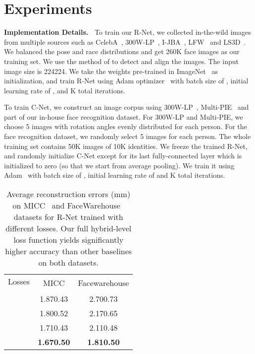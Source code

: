 \documentclass[10pt,twocolumn,letterpaper]{article}
\begin{document}
\section{Experiments}
\noindent\textbf{Implementation Details.~}
To train our R-Net, we collected in-the-wild images from multiple sources such as CelebA~\cite{liu2015deep}, 300W-LP~\cite{zhu2016face}, I-JBA~\cite{klare2015pushing}, LFW~\cite{huang2007labeled} and LS3D~\cite{bulat2017far}. We balanced the pose and race distributions and get 260K face images as our training set. We use the method of \cite{chen2016supervised} to detect and align the images. The input image size is 224224. We take the weights pre-trained in ImageNet~\cite{russakovsky2015imagenet} as initialization, and train R-Net using Adam optimizer~\cite{kingma2015adam} with batch size of , initial learning rate of , and K total iterations.

To train C-Net, we construct an image corpus using 300W-LP~\cite{zhu2016face}, Multi-PIE~\cite{gross2010multi} and part of our in-house face recognition dataset.
For 300W-LP and Multi-PIE, we choose 5 images with rotation angles evenly distributed for each person. For the face recognition dataset, we randomly select 5 images for each person. The whole training set contains 50K images of 10K identities.
We freeze the trained R-Net, and randomly initialize C-Net except for its last fully-connected layer which is initialized to zero (so that we start from average pooling). We train it using Adam~\cite{kingma2015adam} with batch size of , initial learning rate of  and K total iterations.

\begin{table}[t]
	\centering
	\small
	\caption{Average reconstruction errors (mm) on MICC~\cite{bagdanov2011florence} and FaceWarehouse~\cite{cao2014facewarehouse} datasets for R-Net trained with different losses. Our full hybrid-level loss function yields significantly higher accuracy than other baselines on both datasets.}\label{table:loss}
	\begin{tabular}{ccccc}
		\hline
		\multicolumn{3}{c}{Losses} & \multirow{2}{*}{MICC}& \multirow{2}{*}{Facewarehouse}\\
		& & & &\\
		\hline
		&&\checkmark&1.870.43&2.700.73\\
		\checkmark&\checkmark&& 1.800.52 &2.170.65\\
		&\checkmark&\checkmark &1.710.43 &2.110.48\\
		\checkmark&\checkmark&\checkmark& \textbf{1.670.50}& \textbf{1.810.50}\\
		\hline
	\end{tabular}
\end{table}
\end{document}
